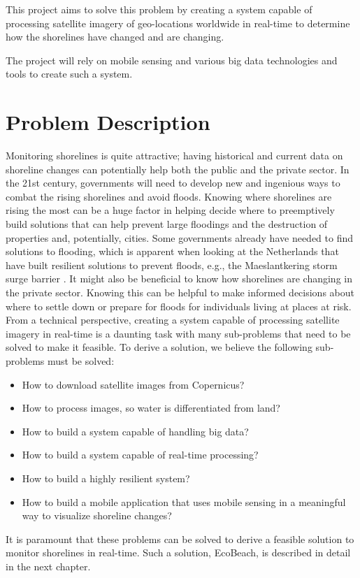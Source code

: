 \noindent
This project aims to solve this problem by creating a system capable of processing satellite imagery of geo-locations worldwide in real-time to determine how the shorelines have changed and are changing. 

The project will rely on mobile sensing and various big data technologies and tools to create such a system.

\section{Problem Description} \label{sec:problem-description}

Monitoring shorelines is quite attractive; having historical and current data on shoreline changes can potentially help both the public and the private sector.  \medbreak 
\noindent
In the 21st century, governments will need to develop new and ingenious ways to combat the rising shorelines and avoid floods. Knowing where shorelines are rising the most can be a huge factor in helping decide where to preemptively build solutions that can help prevent large floodings and the destruction of properties and, potentially, cities.
Some governments already have needed to find solutions to flooding, which is apparent when looking at the Netherlands that have built resilient solutions to prevent floods, e.g., the Maeslantkering storm surge barrier \cite{maeslantkering}. 
\medbreak 
\noindent
It might also be beneficial to know how shorelines are changing in the private sector. Knowing this can be helpful to make informed decisions about where to settle down or prepare for floods for individuals living at places at risk.  \medbreak 
\noindent
From a technical perspective, creating a system capable of processing satellite imagery in real-time is a daunting task with many sub-problems that need to be solved to make it feasible.
To derive a solution, we believe the following sub-problems must be solved:

\begin{itemize}
    \item How to download satellite images from Copernicus?
    \item How to process images, so water is differentiated from land?
    \item How to build a system capable of handling big data? 
    \item How to build a system capable of real-time processing?
    \item How to build a highly resilient system?
    \item How to build a mobile application that uses mobile sensing in a meaningful way to visualize shoreline changes?
\end{itemize}
\noindent
It is paramount that these problems can be solved to derive a feasible solution to monitor shorelines in real-time. Such a solution, EcoBeach, is described in detail in the next chapter.
